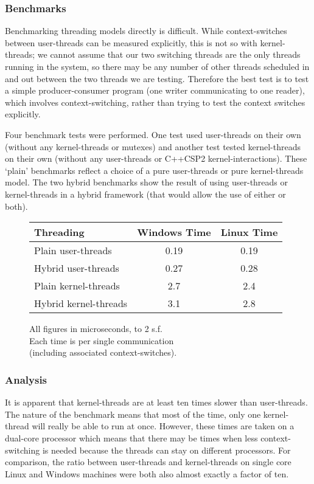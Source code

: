 \documentclass[12pt]{IOS-Book-Article-CPA-2007}
\begin{document}
\subsubsection{Benchmarks}

Benchmarking threading models directly is difficult.  While context-switches between user-threads can be measured explicitly, this is not so with kernel-threads;
we cannot assume that our two switching threads are the only threads running in the system, so there may be any number of other threads scheduled in and out
between the two threads we are testing.  Therefore the best test is to test a simple producer-consumer program (one writer communicating to one 
reader), which involves context-switching, rather than trying to test the context switches explicitly.

Four benchmark tests were performed.  One test used user-threads on their own (without any kernel-threads or mutexes) and another test tested kernel-threads
on their own (without any user-threads or C++CSP2 kernel-interactions).  These `plain' benchmarks reflect a choice of a pure user-threads or pure kernel-threads
model.  The two hybrid benchmarks show the result of using user-threads or kernel-threads in a hybrid framework (that would allow the use of either or both).

\begin{figure}[h]
\begin{tabular}{l|c|c}
Threading & Windows Time & Linux Time \\
\hline
Plain user-threads & 0.19 & 0.19\\
Hybrid user-threads & 0.27 & 0.28\\
\hline
Plain kernel-threads & 2.7 & 2.4\\
Hybrid kernel-threads & 3.1 & 2.8\\
\end{tabular}

All figures in microseconds, to 2 s.f.  \\ Each time is per single communication \\ (including associated context-switches).
\end{figure}

\subsubsection{Analysis}

It is apparent that kernel-threads are at least ten times slower than user-threads.  The nature of the benchmark means that most of the time, only one 
kernel-thread will really be able to run at once.  However, these times are taken on a dual-core processor which means that there may be times 
when less context-switching is needed because the threads can stay on different processors.  For comparison, the ratio between user-threads and 
kernel-threads on single core Linux and Windows machines were both also almost exactly a factor of ten.
\end{document}
